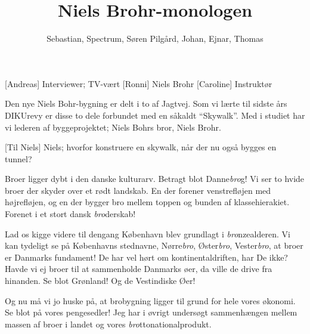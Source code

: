 \documentclass[a4paper,11pt]{article}
\title{Niels Brohr-monologen}
\author{Sebastian, Spectrum, Søren Pilgård, Johan, Ejnar, Thomas}
\begin{document}
\maketitle

\begin{roles}
  [Andreas]  Interviewer; TV-vært
  [Ronni] Niels Brohr
  [Caroline] Instruktør
\end{roles}

%

\begin{sketch}


 Den nye Niels Bohr-bygning er delt i to af Jagtvej. Som vi lærte til sidste
         års DIKUrevy er disse to dele forbundet med en såkaldt ``Skywalk''. Med i studiet har vi
         lederen af byggeprojektet; Niels Bohrs bror, Niels Brohr.

[Til Niels] Niels; hvorfor konstruere en skywalk, når der nu også bygges en tunnel?

%
%



    Broer ligger dybt i den danske kulturarv.
    Betragt blot Danne\emph{bro}g! Vi ser to hvide broer der skyder over et rødt landskab.
    En der forener venstrefløjen med højrefløjen, og en der bygger bro
    mellem toppen og bunden af klassehierakiet. Forenet i et stort dansk
    \emph{bro}derskab!

    Lad os kigge videre til dengang København blev grundlagt i \emph{bro}nzealderen.
    Vi kan tydeligt se på Københavns stednavne, Nørre\emph{bro},
    Øster\emph{bro}, Vester\emph{bro}, at broer er Danmarks fundament!
    De har vel hørt om kontinentaldriften, har De ikke?
    Havde vi ej broer til at sammenholde Danmarks øer, da ville de drive fra
    hinanden. Se blot Grønland! Og de Vestindiske Øer!

    Og nu må vi jo huske på, at brobygning ligger til grund for hele vores økonomi.
    Se blot på vores pengesedler! %
    Jeg har i øvrigt undersøgt sammenhængen mellem massen af broer i landet
    og vores \emph{bro}ttonationalprodukt.


\end{sketch}
\end{document}
